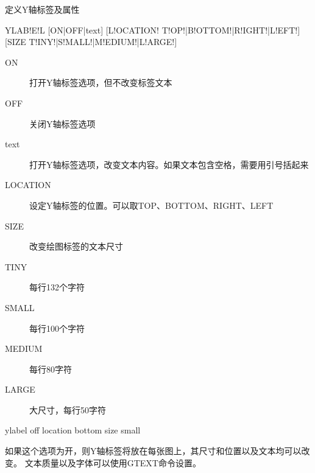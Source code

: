 \label{cmd:ylabel}

定义Y轴标签及属性

\begin{SACSTX}
YLAB!E!L [ON|OFF|text] [L!OCATION! T!OP!|B!OTTOM!|R!IGHT!|L!EFT!] 
    [SIZE T!INY!|S!MALL!|M!EDIUM!|L!ARGE!]
\end{SACSTX}

\begin{description}
\item [ON] 打开Y轴标签选项，但不改变标签文本
\item [OFF] 关闭Y轴标签选项 
\item [text] 打开Y轴标签选项，改变文本内容。如果文本包含空格，需要用引号括起来
\item [LOCATION] 设定Y轴标签的位置。可以取TOP、BOTTOM、RIGHT、LEFT
\item [SIZE] 改变绘图标签的文本尺寸
\item [TINY] 每行132个字符
\item [SMALL] 每行100个字符 
\item [MEDIUM] 每行80字符 
\item [LARGE] 大尺寸，每行50字符 
\end{description}

\begin{SACDFT}
ylabel off location bottom size small
\end{SACDFT}

如果这个选项为开，则Y轴标签将放在每张图上，其尺寸和位置以及文本均可以改变。
文本质量以及字体可以使用GTEXT命令设置。

